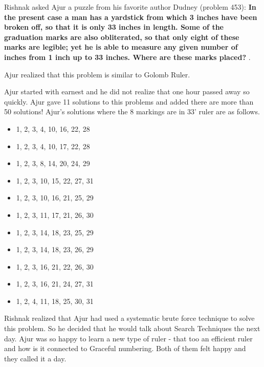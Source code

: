 Rishnak asked Ajur a puzzle from his favorite author Dudney (problem 453):
\textbf{In the present case a man has a yardstick from which 3 inches have
been broken off, so that it is only 33 inches in length. Some of the graduation
marks are also obliterated, so that only eight of these marks are legible; yet
he is able to measure any given number of inches from 1 inch up to 33 inches.
Where are these marks placed? }.

Ajur realized that this problem is similar to Golomb Ruler. 

Ajur started with earnest and he did not realize that one hour passed away so quickly. Ajur gave 11 solutions to this problems and added there are more than 50 solutions! Ajur's solutions where the 8 markings are in 33' ruler are as follows.
\begin{itemize}
    \item 1, 2, 3, 4, 10, 16, 22, 28
    \item 1, 2, 3, 4, 10, 17, 22,  28
    \item 1, 2, 3, 8, 14, 20, 24, 29
    \item 1, 2, 3, 10, 15, 22, 27, 31
    \item 1, 2, 3, 10, 16, 21, 25, 29
     \item 1, 2, 3, 11, 17, 21, 26, 30
     \item 1, 2, 3, 14, 18, 23, 25, 29
     \item 1, 2, 3, 14, 18, 23, 26, 29
     \item 1, 2, 3, 16, 21, 22, 26, 30
     \item 1, 2, 3, 16, 21, 24, 27, 31
     \item 1, 2, 4, 11, 18, 25, 30, 31
\end{itemize}
Rishnak  realized that Ajur had used a systematic brute force technique to solve this problem. So he decided that he would talk about Search Techniques the next day.
Ajur was so happy to learn a new type of ruler - that too an efficient ruler and how is it connected to Graceful numbering. Both of them felt happy and they called it a day.